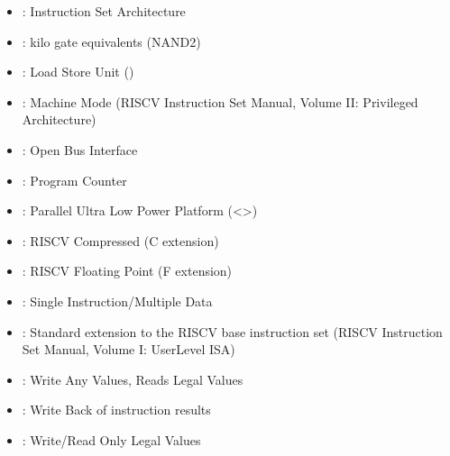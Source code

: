 \documentclass[letterpaper,10pt,english]{sphinxmanual}
\begin{document}
\begin{itemize}
\item {} 
\sphinxAtStartPar
{}: Instruction Set Architecture

\item {} 
\sphinxAtStartPar
{}: kilo gate equivalents (NAND2)

\item {} 
\sphinxAtStartPar
{}: Load Store Unit ({\hyperref[\detokenize{load_store_unit:load-store-unit}]{}})

\item {} 
\sphinxAtStartPar
{}: Machine Mode (RISC\sphinxhyphen{}V Instruction Set Manual, Volume II: Privileged Architecture)

\item {} 
\sphinxAtStartPar
{}: Open Bus Interface

\item {} 
\sphinxAtStartPar
{}: Program Counter

\item {} 
\sphinxAtStartPar
{}: Parallel Ultra Low Power Platform (\textless{}\textgreater{})

\item {} 
\sphinxAtStartPar
{}: RISC\sphinxhyphen{}V Compressed (C extension)

\item {} 
\sphinxAtStartPar
{}: RISC\sphinxhyphen{}V Floating Point (F extension)

\item {} 
\sphinxAtStartPar
{}: Single Instruction/Multiple Data

\item {} 
\sphinxAtStartPar
{}: Standard extension to the RISC\sphinxhyphen{}V base instruction set (RISC\sphinxhyphen{}V Instruction Set Manual, Volume I: User\sphinxhyphen{}Level ISA)

\item {} 
\sphinxAtStartPar
{}: Write Any Values, Reads Legal Values

\item {} 
\sphinxAtStartPar
{}: Write Back of instruction results

\item {} 
\sphinxAtStartPar
{}: Write/Read Only Legal Values


\end{itemize}
\end{document}

